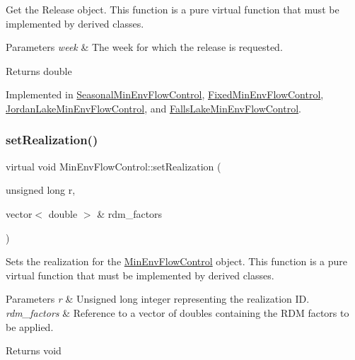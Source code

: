 Get the Release object. This function is a pure virtual function that must be implemented by derived classes. 


\begin{DoxyParams}{Parameters}
{\em week} & The week for which the release is requested.\\
\hline
\end{DoxyParams}
\begin{DoxyReturn}{Returns}
double 
\end{DoxyReturn}


Implemented in \mbox{\hyperlink{classSeasonalMinEnvFlowControl_a5c5ddcab367812bdd2e23b383449d202}{Seasonal\+Min\+Env\+Flow\+Control}}, \mbox{\hyperlink{classFixedMinEnvFlowControl_af3ef98eef6a7124738a3b54dcadf757f}{Fixed\+Min\+Env\+Flow\+Control}}, \mbox{\hyperlink{classJordanLakeMinEnvFlowControl_a5c2456c26fa141824c247cd15bf5c57d}{Jordan\+Lake\+Min\+Env\+Flow\+Control}}, and \mbox{\hyperlink{classFallsLakeMinEnvFlowControl_a50453b443fb6e5869fcfc9a183f42b2f}{Falls\+Lake\+Min\+Env\+Flow\+Control}}.

\mbox{\label{classMinEnvFlowControl_a630550c31f5c4e1a368289cbd5ab98ee}} 
\subsubsection{\texorpdfstring{set\+Realization()}{setRealization()}}
{\footnotesize\ttfamily virtual void Min\+Env\+Flow\+Control\+::set\+Realization (\begin{DoxyParamCaption}\item[{unsigned long}]{r,  }\item[{vector$<$ double $>$ \&}]{rdm\+\_\+factors }\end{DoxyParamCaption})\hspace{0.3cm}{\ttfamily [virtual]}}



Sets the realization for the {\ttfamily \mbox{\hyperlink{classMinEnvFlowControl}{Min\+Env\+Flow\+Control}}} object. This function is a pure virtual function that must be implemented by derived classes. 


\begin{DoxyParams}{Parameters}
{\em r} & Unsigned long integer representing the realization ID. \\
\hline
{\em rdm\+\_\+factors} & Reference to a vector of doubles containing the R\+DM factors to be applied.\\
\hline
\end{DoxyParams}
\begin{DoxyReturn}{Returns}
void 
\end{DoxyReturn}


